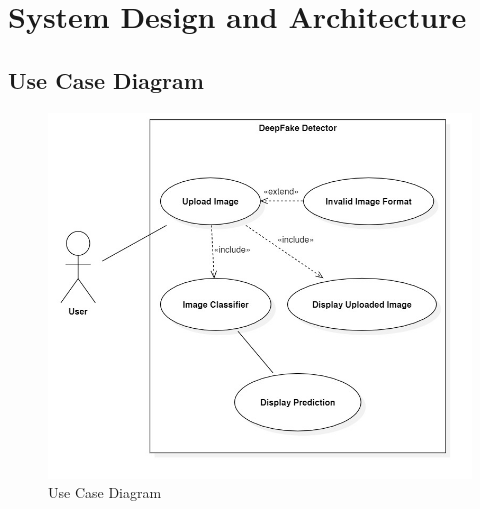 \chapter{System Design and Architecture}

\section{Use Case Diagram}
\begin{figure}[ht]
  \includegraphics[width=1\textwidth]{./img/UseCaseDiagram.jpg}
  \caption{Use Case Diagram}
\end{figure}

\pagebreak

